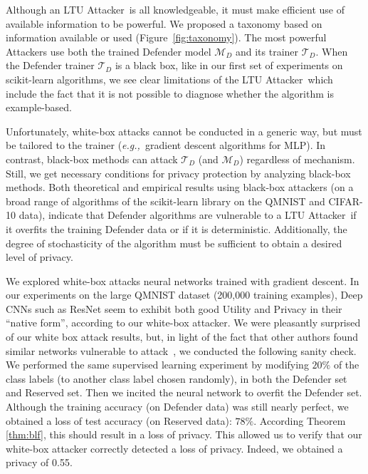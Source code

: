 \documentclass[letterpaper]{article}
\newcommand{\eg}{{\em e.g.,~}}
\newcommand{\oracle}{LTU Attacker~}
\begin{document}
Although an \oracle is all knowledgeable, it must make efficient use of available information to be powerful. We proposed a taxonomy
based on information available or used (Figure~\ref{fig:taxonomy}). The most powerful Attackers use both the trained Defender model $\mathcal{M}_D$ and its trainer $\mathcal{T}_D$.  
When the Defender trainer $\mathcal{T}_D$ is a black box, like in our first set of experiments on scikit-learn algorithms, we see clear limitations of the \oracle which include the fact that it is not possible to diagnose whether the algorithm is example-based.

Unfortunately, white-box attacks cannot be conducted in a generic way, but must be tailored to the trainer (\eg  gradient descent algorithms for MLP). In contrast, black-box methods can attack $\mathcal{T}_D$ (and $\mathcal{M}_D$) regardless of mechanism. Still, we get necessary conditions for privacy protection by analyzing black-box methods. Both theoretical and empirical results using black-box attackers (on a broad range of algorithms of the scikit-learn library on the QMNIST and CIFAR-10 data),
indicate that Defender algorithms are vulnerable to a \oracle if it overfits the training Defender data or if it is deterministic. Additionally, the degree of stochasticity of the algorithm must be sufficient to obtain a desired level of privacy.

We explored white-box attacks neural networks trained with gradient descent. In our experiments on the large QMNIST dataset (200,000 training examples),
Deep CNNs such as ResNet seem to exhibit both good Utility and Privacy in their ``native form'', according to our white-box attacker.
We were pleasantly surprised of our white box attack results, but, in light of the fact that other authors found similar networks vulnerable to attack~\cite{nasr2019comprehensive}, we conducted the following sanity check.
We performed the same supervised learning experiment by modifying \(20\%\) of the class labels (to another class label chosen randomly), in both the Defender set and Reserved set. Then we incited the neural network to overfit the Defender set. Although the training accuracy (on Defender data) was still nearly perfect, we obtained a loss of test accuracy (on Reserved data): $78\%$. According Theorem \ref{thm:blf}, this should result in a loss of privacy. This allowed us to verify that our white-box attacker correctly detected a loss of privacy. Indeed, we obtained a privacy of 0.55.
\end{document}
